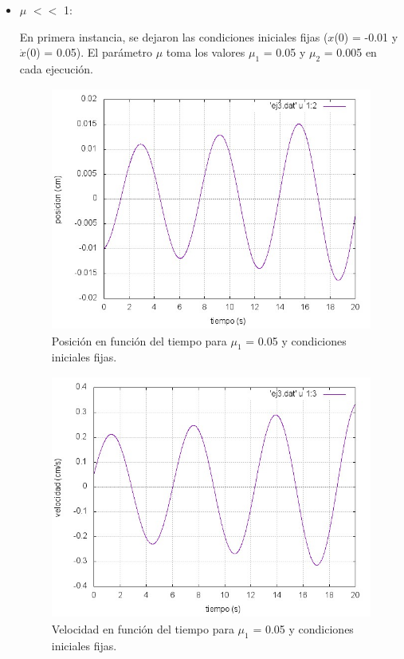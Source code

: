 \documentclass[a4paper,12pt]{article}
\begin{document}
\begin{itemize}
\item $\mu$ $<<$ 1:


En primera instancia, se dejaron las condiciones iniciales fijas ($x$(0) = -0.01 y $\dot{x}$(0) = 0.05). El par\'ametro $\mu$ toma los valores $\mu_1$ = 0.05 y $\mu_2$ = 0.005 en cada ejecuci\'on. 

\begin{figure}[H]
\begin{center}
\includegraphics[height=8cm]{grafico_ej3_xVSt.jpg}
\caption[width=5cm]{Posici\'on en funci\'on del tiempo para $\mu_1$ = 0.05 y condiciones iniciales fijas.}
\end{center}
\end{figure}

\begin{figure}[H]
\begin{center}
\includegraphics[height=8cm]{grafico_ej3_vVSt.jpg}
\caption[width=5cm]{Velocidad en funci\'on del tiempo para $\mu_1$ = 0.05 y condiciones iniciales fijas.}
\end{center}
\end{figure}


\end{itemize}
\end{document}
